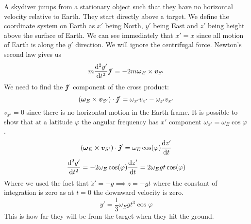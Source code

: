 \documentclass{article}
\begin{document}
    \example
    A skydiver jumps from a stationary object such that they have no horizontal velocity relative to Earth.
    They start directly above a target.
    We define the coordinate system on Earth as \(x'\) being North, \(y'\) being East and \(z'\) being height above the surface of Earth.
    We can see immediately that \(x' = x\) since all motion of Earth is along the \(y'\) direction.
    We will ignore the centrifugal force.
    Newton's second law gives us
    \[m\dv[2]{y'}{t}\bm{\hat{\jmath}}' = -2m\bm{\omega}_E\times\bm{v}_{S'}\]
    We need to find the \(\bm{\hat{\jmath}}'\) component of the cross product:
    \[(\bm{\omega}_E\times\bm{v}_{S'})\cdot\bm{\hat{\jmath}}' = \omega_{x'}v_{z'} - \omega_{z'}v_{x'}\]
    \(v_{x'} = 0\) since there is no horizontal motion in the Earth frame.
    It is possible to show that at a latitude \(\varphi\) the angular frequency has \(x'\) component \(\omega_{x'} = \omega_E\cos\varphi\).
    \[(\bm{\omega}_E\times\bm{v}_{S'})\cdot\bm{\hat{\jmath}}' = \omega_E\cos(\varphi)\dv{z'}{t}\]
    \[\dv[2]{y'}{t} = -2\omega_E\cos(\varphi)\dv{z'}{t} = 2\omega_E gt\cos(\varphi)\]
    Where we used the fact that \(\ddot z' = -g\implies \dot z = -gt\) where the constant of integration is zero as at \(t = 0\) the downward velocity is zero.
    \[y' = \frac{1}{3}\omega_Egt^3\cos\varphi\]
    This is how far they will be from the target when they hit the ground.
    
\end{document}
